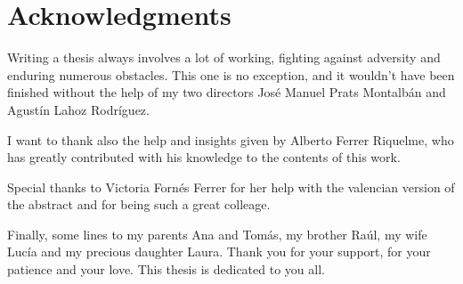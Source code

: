 \chapter*{Acknowledgments}


Writing a thesis always involves a lot of working, fighting against adversity and enduring numerous obstacles. This one is no exception, and it wouldn’t have been finished without the help of my two directors José Manuel Prats Montalbán and Agustín Lahoz Rodríguez. 

I want to thank also the help and insights given by Alberto Ferrer Riquelme, who has greatly contributed with his knowledge to the contents of this work.

Special thanks to Victoria Fornés Ferrer for her help with the valencian version of the abstract and for being such a great colleage.

Finally, some lines to my parents Ana and Tomás, my brother Raúl, my wife Lucía and my precious daughter Laura. Thank you for your support, for your patience and your love. This thesis is dedicated to you all.
